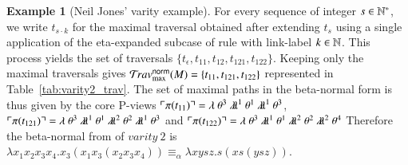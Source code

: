 \documentclass{elsarticle}
\theoremstyle{plain}
\theoremstyle{definition}
\newtheorem{example}{Example}[section]
\theoremstyle{remark}
\newcommand{\ghostlmd}{{\lambda\!\!\lambda}}
\newcommand{\ghostvar}{\theta}
\newcommand{\normalizing}{{\sf norm}}
\newcommand{\travsetnorm}{\travset^\normalizing}
\def\coresymbol{\pi} %
\newcommand{\core}[1]{\coresymbol(#1)} %
\begin{document}
\begin{example}[Neil Jones' varity example]
For every sequence of integer $s \in \mathbb{N}^*$, we write $t_{s \cdot k}$ for the maximal traversal obtained after extending $t_s$ using a single application of the eta-expanded subcase of rule  with link-label $k \in \mathbb{N}$. This process yields the set of traversals $\{t_\epsilon, t_{11}, t_{12}, t_{121}, t_{122} \}$. Keeping only the maximal traversals gives $\travsetnorm_{\max}(M) = \{ t_{11}, t_{121}, t_{122} \}$ represented in Table~\ref{tab:varity2_trav}. The set of maximal paths in the beta-normal form is thus given by the core P-views
$\pview{\core{t_{11}}} =
        \lambda \ \ghostvar^{3}\ \ghostlmd^{1}\
        \ghostvar^{1}\ \ghostlmd^{1}\ \ghostvar^{3}
$,
$\pview{\core{t_{121}}} =
        \lambda \ \ghostvar^{3}\ \ghostlmd^{1}\ \ghostvar^{1}\ \ghostlmd^{2}\ \ghostvar^{2}\ \ghostlmd^{1}\ \ghostvar^{3}$
and
$\pview{\core{t_{122}}} =
    \lambda \ \ghostvar^{3}\ \ghostlmd^{1}\ \ghostvar^{1}\ \ghostlmd^{2}\ \ghostvar^{2}\ \ghostlmd^{2}\ \ghostvar^{4}$
Therefore the beta-normal from of $varity\ 2$ is
$\lambda x_1 x_2 x_3 x_4 . x_3 (x_1 x_3 (x_2 x_3 x_4)) \equiv_\alpha \lambda x y s z . s (x s (y s z))
$.
\end{example}
\end{document}
